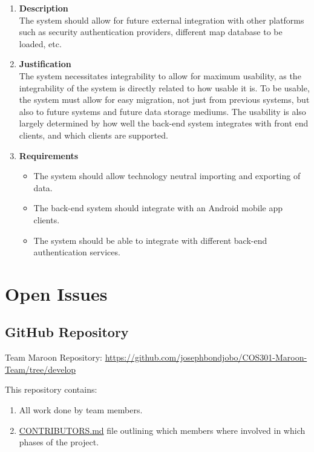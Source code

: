 \documentclass[a4paper,10pt]{article}
\begin{document}
\begin{enumerate}
\item \textbf{Description} \\
The system should allow for future external integration with other platforms such as security authentication providers, different map database to be loaded, etc.
\item \textbf{Justification} \\
The system necessitates integrability to allow for maximum usability, as the integrability of the system is directly related to how usable it is. To be usable, the system must allow for easy migration, not just from previous systems, but also to future systems and future data storage mediums. The usability is also largely determined by how well the back-end system integrates with front end clients, and which clients are supported.
\item \textbf{Requirements}
	\begin{itemize}
		\item The system should allow technology neutral importing and exporting of data.
		\item The back-end system should integrate with an Android mobile app clients.
		\item The system should be able to integrate with different back-end authentication services.
	\end{itemize}
\end{enumerate}

\clearpage
\section{Open Issues}
\subsection {GitHub Repository}
Team Maroon Repository: \url{https://github.com/josephbondjobo/COS301-Maroon-Team/tree/develop}

This repository contains:
\begin{enumerate}
\item All work done by team members.
\item \href{https://github.com/josephbondjobo/COS301-Maroon-Team/blob/develop/Intro/Contributors.md}{CONTRIBUTORS.md} file outlining which members where involved in which phases of the project.
\end{enumerate}



\newpage
\clearpage
{}
\end{document}
